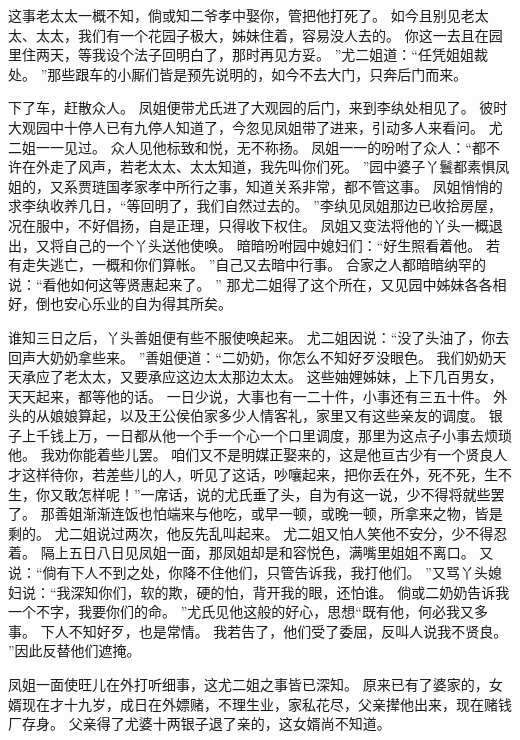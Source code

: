 这事老太太一概不知，倘或知二爷孝中娶你，管把他打死了。
如今且别见老太太、太太，我们有一个花园子极大，姊妹住着，容易没人去的。
你这一去且在园里住两天，等我设个法子回明白了，那时再见方妥。
”尤二姐道：“任凭姐姐裁处。
”那些跟车的小厮们皆是预先说明的，如今不去大门，只奔后门而来。
\par
下了车，赶散众人。
凤姐便带尤氏进了大观园的后门，来到李纨处相见了。
彼时大观园中十停人已有九停人知道了，今忽见凤姐带了进来，引动多人来看问。
尤二姐一一见过。
众人见他标致和悦，无不称扬。
凤姐一一的吩咐了众人：“都不许在外走了风声，若老太太、太太知道，我先叫你们死。
”园中婆子丫鬟都素惧凤姐的，又系贾琏国孝家孝中所行之事，知道关系非常，都不管这事。
凤姐悄悄的求李纨收养几日，“等回明了，我们自然过去的。
”李纨见凤姐那边已收拾房屋，况在服中，不好倡扬，自是正理，只得收下权住。
凤姐又变法将他的丫头一概退出，又将自己的一个丫头送他使唤。
暗暗吩咐园中媳妇们：“好生照看着他。
若有走失逃亡，一概和你们算帐。
”自己又去暗中行事。
合家之人都暗暗纳罕的说：“看他如何这等贤惠起来了。
” 那尤二姐得了这个所在，又见园中姊妹各各相好，倒也安心乐业的自为得其所矣。
\par
谁知三日之后，丫头善姐便有些不服使唤起来。
尤二姐因说：“没了头油了，你去回声大奶奶拿些来。
”善姐便道：“二奶奶，你怎么不知好歹没眼色。
我们奶奶天天承应了老太太，又要承应这边太太那边太太。
这些妯娌姊妹，上下几百男女，天天起来，都等他的话。
一日少说，大事也有一二十件，小事还有三五十件。
外头的从娘娘算起，以及王公侯伯家多少人情客礼，家里又有这些亲友的调度。
银子上千钱上万，一日都从他一个手一个心一个口里调度，那里为这点子小事去烦琐他。
我劝你能着些儿罢。
咱们又不是明媒正娶来的，这是他亘古少有一个贤良人才这样待你，若差些儿的人，听见了这话，吵嚷起来，把你丢在外，死不死，生不生，你又敢怎样呢！”一席话，说的尤氏垂了头，自为有这一说，少不得将就些罢了。
那善姐渐渐连饭也怕端来与他吃，或早一顿，或晚一顿，所拿来之物，皆是剩的。
尤二姐说过两次，他反先乱叫起来。
尤二姐又怕人笑他不安分，少不得忍着。
隔上五日八日见凤姐一面，那凤姐却是和容悦色，满嘴里姐姐不离口。
又说：“倘有下人不到之处，你降不住他们，只管告诉我，我打他们。
”又骂丫头媳妇说：“我深知你们，软的欺，硬的怕，背开我的眼，还怕谁。
倘或二奶奶告诉我一个不字，我要你们的命。
”尤氏见他这般的好心，思想“既有他，何必我又多事。
下人不知好歹，也是常情。
我若告了，他们受了委屈，反叫人说我不贤良。
”因此反替他们遮掩。
\par
凤姐一面使旺儿在外打听细事，这尤二姐之事皆已深知。
原来已有了婆家的，女婿现在才十九岁，成日在外嫖赌，不理生业，家私花尽，父亲撵他出来，现在赌钱厂存身。
父亲得了尤婆十两银子退了亲的，这女婿尚不知道。
